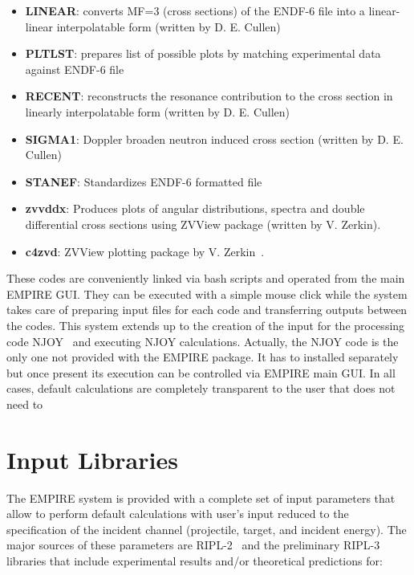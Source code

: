 \begin{itemize}
\item \textbf{LINEAR}: converts MF=3 (cross sections) of the ENDF-6 file
into a linear-linear interpolatable form (written by D. E. Cullen)~\cite%
{PREPRO}

\item \textbf{PLTLST}: prepares list of possible plots by matching
experimental data against ENDF-6 file

\item \textbf{RECENT}: reconstructs the resonance contribution to the cross
section in linearly interpolatable form (written by D. E. Cullen)~\cite%
{PREPRO}

\item \textbf{SIGMA1}: Doppler broaden neutron induced cross section
(written by D. E. Cullen)~\cite{PREPRO}

\item \textbf{STANEF}: Standardizes ENDF-6 formatted file

\item \textbf{zvvddx}: Produces plots of angular distributions, spectra and
double differential cross sections using ZVView package (written by V.
Zerkin).

\item \textbf{c4zvd}: ZVView\textbf{%
} plotting package by V. Zerkin~\cite{ZVView}.
\end{itemize}

These codes are conveniently linked via bash scripts and operated from the
main EMPIRE GUI. They can be executed with a simple mouse click while the
system takes care of preparing input files for each code and transferring
outputs between the codes. This system extends up to the creation of the
input for the processing code NJOY~\cite{MacFarlane:06,MacFarlane:94} and
executing NJOY calculations. Actually, the NJOY code is the only one not
provided with the EMPIRE package. It has to installed separately but once
present its execution can be controlled via EMPIRE main GUI. In all cases,
default calculations are completely transparent to the user that does not
need to

\section{Input Libraries}

The EMPIRE system is provided with a complete set of input parameters that
allow to perform default calculations with user's input reduced to the
specification of the incident channel (projectile, target, and incident
energy). The major sources of these parameters are RIPL-2~\cite{ripl2} and
the preliminary RIPL-3 libraries that include experimental results and/or
theoretical predictions for:

